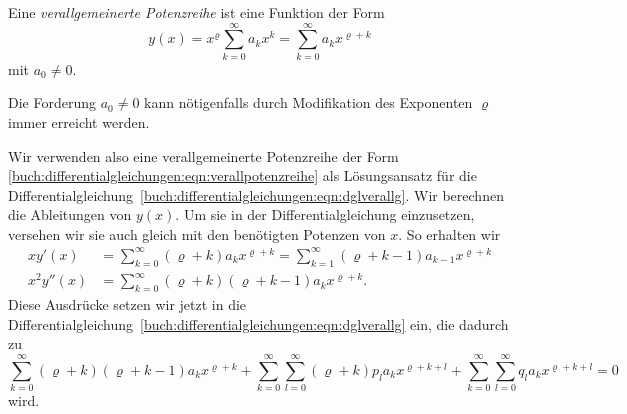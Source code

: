 \begin{definition}
\label{buch:differentialgleichungen:def:verallpotenzreihe}
Eine {\em verallgemeinerte Potenzreihe} ist eine Funktion der Form
\begin{equation}
y(x)
=
x^\varrho \sum_{k=0}^\infty a_kx^k
=
\sum_{k=0}^\infty a_k x^{\varrho+k}
\label{buch:differentialgleichungen:eqn:verallpotenzreihe}
\end{equation}
mit $a_0\ne 0$.
\end{definition}

Die Forderung $a_0\ne 0$ kann nötigenfalls durch Modifikation des
Exponenten $\varrho$ immer erreicht werden.

Wir verwenden also eine verallgemeinerte Potenzreihe der Form
\eqref{buch:differentialgleichungen:eqn:verallpotenzreihe}
als Lösungsansatz für die
Differentialgleichung~\eqref{buch:differentialgleichungen:eqn:dglverallg}.
Wir berechnen die Ableitungen von $y(x)$. Um sie in der
Differentialgleichung einzusetzen, versehen wir sie auch gleich mit den
benötigten Potenzen von $x$.
So erhalten wir
\begin{align*}
xy'(x)
&=
\sum_{k=0}^\infty
(\varrho+k)a_kx^{\varrho+k}
=
\sum_{k=1}^\infty
(\varrho+k-1)a_{k-1}x^{\varrho+k}
\\
x^2y''(x)
&=
\sum_{k=0}^\infty
(\varrho+k)(\varrho+k-1)a_kx^{\varrho+k}.
\end{align*}
Diese Ausdrücke setzen wir jetzt in die 
Differentialgleichung~\eqref{buch:differentialgleichungen:eqn:dglverallg}
ein, die dadurch zu
\begin{equation}
\sum_{k=0}^\infty  (\varrho+k)(\varrho+k-1) a_k x^{\varrho+k}
+
\sum_{k=0}^\infty \sum_{l=0}^\infty (\varrho+k) p_l a_kx^{\varrho+k+l}
+
\sum_{k=0}^\infty \sum_{l=0}^\infty q_l a_k x^{\varrho+k+l}
=
0
\label{buch:differentialgleichungen:eqn:veralgpotenzsumme}
\end{equation}
wird.

